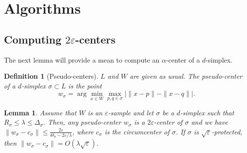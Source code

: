 \documentclass[11pt,a4paper]{article}
\newtheorem{definition}{Definition}
\newtheorem{lemma}{Lemma}
\newcommand{\e}{\varepsilon}
\begin{document}
\section{Algorithms}

\subsection{Computing $2\e$-centers}

The next lemma will provide a mean to compute an
$\alpha$-center of a $d$-simplex. 

\begin{definition}[Pseudo-centers]
$L$ and $W$ are given as usual.
The pseudo-center of a $d$-simplex $\sigma\subset L$ is the point 
$$w_{\sigma} = \arg\min_{x\in W}\max_{p,q\in \sigma} | \| x-p\| -\|x-q\| |. $$
\end{definition}



\begin{lemma}
Assume that $W$ is an $\e$-sample and let $\sigma$ be a $d$-simplex
such that $R_{\sigma}\leq \lambda \leq \Delta_{\sigma}$. Then, any
pseudo-center $w_{\sigma}$ is a
$2\e$-center of $\sigma$ and we have  $\|
w_{\sigma}-c_{\sigma}\| \leq \frac{2\e}{\Theta_{\sigma}-
  2\e/\lambda}$, where $c_{\sigma}$ is the circumcenter of
$\sigma$. %
If $\sigma$ is $\sqrt{\e}$-protected, then   $\|
w_{\sigma}-c_{\sigma}\| = O(\lambda\sqrt{\e})$.
\label{lemma-wsigma}
\end{lemma}
\end{document}
